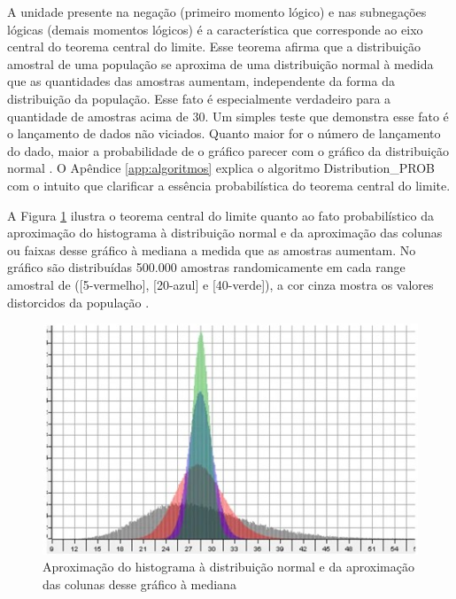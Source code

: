 A unidade presente na negação (primeiro momento lógico) e nas subnegações lógicas (demais momentos lógicos) é a característica que corresponde ao eixo central do teorema central do limite. Esse teorema afirma que a distribuição amostral de uma população se aproxima de uma distribuição normal à medida que as quantidades das amostras aumentam, independente da forma da distribuição da população. Esse fato é especialmente verdadeiro para a quantidade de amostras acima de 30. Um simples teste que demonstra esse fato é o lançamento de dados não viciados. Quanto maior for o número de lançamento do dado, maior a probabilidade de o gráfico parecer com o gráfico da distribuição normal \cite{statisticshowto_teorema_central_limite}. O Apêndice \ref{app:algoritmos} explica o algoritmo Distribution\_PROB com o intuito que clarificar a essência probabilística do teorema central do limite.

A Figura \ref{fig:statisticsbyjim_central_limit_theorem} ilustra o teorema central do limite quanto ao fato probabilístico da aproximação do histograma à distribuição normal e da aproximação das colunas ou faixas desse gráfico à mediana a medida que as amostras aumentam. No gráfico são distribuídas 500.000 amostras randomicamente em cada range amostral de ([5-vermelho], [20-azul] e [40-verde]), a cor cinza mostra os valores distorcidos da população \cite{statisticsbyjim_central_limite_theorem_explainded}.
	\begin{figure}[H]
	\caption{Aproximação do histograma à distribuição normal e da aproximação das colunas desse gráfico à mediana}
	\label{fig:statisticsbyjim_central_limit_theorem}
	\centering
	\includegraphics[scale=1.2]{sections/images/statisticsbyjim_central_limit_theorem.jpg}
	\end{figure}

